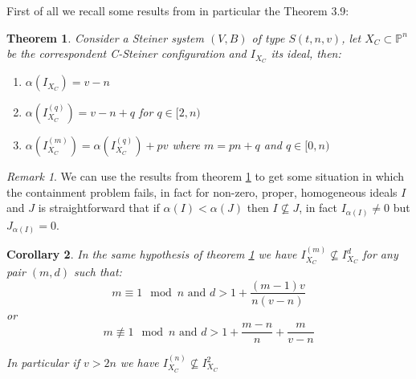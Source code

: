 \documentclass[a4wide]{book}
\theoremstyle{plain}
\newtheorem{teo}{Theorem}[section]
\newtheorem{cor}[teo]{Corollary}
\theoremstyle{remark}
\newtheorem{rem}{Remark}
\theoremstyle{definition}
\newcommand{\PP}{\mathbb{P}}
\begin{document}
 First of all we recall some results from \cite{Bal20Steiner} in particular the Theorem 3.9:
 
 \begin{teo} \label{teo:alphaXC}
Consider a Steiner system $ (V,B) $ of type $ S(t,n,v) $, let $ X_C \subset \PP^n$ be the correspondent C-Steiner configuration and $ I_{X_C} $ its ideal, then:
\begin{enumerate}
\item $ \alpha(I_{X_C}) = v- n $
\item $ \alpha(I_{X_C}^{(q)}) = v- n +q  $ for $ q \in [2,n) $
\item $ \alpha(I_{X_C}^{(m)}) = \alpha(I_{X_C}^{(q)}) + pv $ where $ m=pn + q $ and $ q \in [0,n) $
\end{enumerate}
 \end{teo}
 
 
  
\begin{rem}\label{rem:alphaXC}
We can use the results from theorem \ref{teo:alphaXC} to get some situation in which the containment problem fails, in fact for non-zero, proper, homogeneous ideals $ I $ and $ J $ is straightforward that if $ \alpha(I) < \alpha(J) $ then $ I \not\subseteq J $, in fact $ I_{ \alpha(I) } \neq 0$ but $ J_{ \alpha(I) } = 0 $. 
\end{rem}

\begin{cor}\label{cor:alphaXC}
In the same hypothesis of theorem \ref{teo:alphaXC} we have $ I_{X_C}^{(m)} \not \subseteq I_{X_C}^d $ for any pair $ (m,d) $ such that:
\begin{equation}\label{eq:cor:alphaXC:1}
	m \equiv 1 \mod n \text{ and } d > 1 + \frac{ (m-1)v }{ n(v-n)}
\end{equation}
or 
\begin{equation}\label{eq:cor:alphaXC:2}
	m \not \equiv 1 \mod n \text{ and } d > 1  + \frac{ m - n }{ n } + \frac{ m }{ v - n }
\end{equation}

 In particular if $ v > 2n $ we have $ I_{X_C}^{(n)} \not \subseteq I_{X_C}^2  $
 \end{cor}
  
\end{document}
